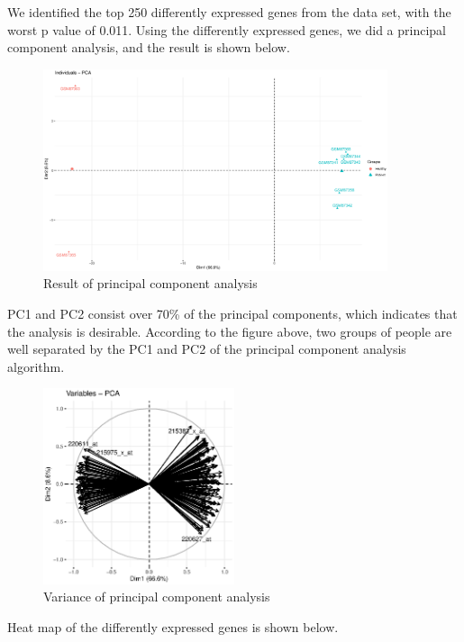 We identified the top 250 differently expressed genes from the data set, with the worst p value of 0.011. Using the differently expressed genes, we did a principal component analysis, and the result is shown below.

\begin{figure}[H]
    \centering
    \includegraphics[width=0.9\textwidth]{image/PCACD31.eps}
    \caption{Result of principal component analysis}
    \label{PCACD3}
\end{figure}

PC1 and PC2 consist over 70\% of the principal components, which indicates that the analysis is desirable. According to the figure above, two groups of people are well separated by the PC1 and PC2 of the principal component analysis algorithm.

\begin{figure}[H]
    \centering
    \includegraphics[width=0.5\textwidth]{image/PCAVCD3.eps}
    \caption{Variance of principal component analysis}
    \label{PCACD3}
\end{figure}


Heat map of the differently expressed genes is shown below.

